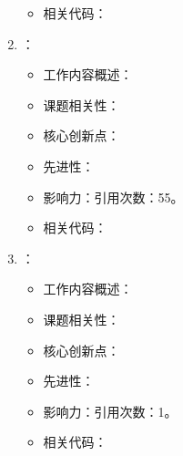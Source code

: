 \begin{enumerate}
\begin{itemize}
                \item 相关代码：
            \end{itemize}
            \item \citet{crosson2021prospects}：
            \begin{itemize}
                \item 工作内容概述：
                \item 课题相关性：
                \item 核心创新点：
                \item 先进性：
                \item 影响力：引用次数：55。
                \item 相关代码：
            \end{itemize}
            \item \citet{inack2022neural}：
            \begin{itemize}
                \item 工作内容概述：
                \item 课题相关性：
                \item 核心创新点：
                \item 先进性：
                \item 影响力：引用次数：1。
                \item 相关代码：
            \end{itemize}
\end{enumerate}